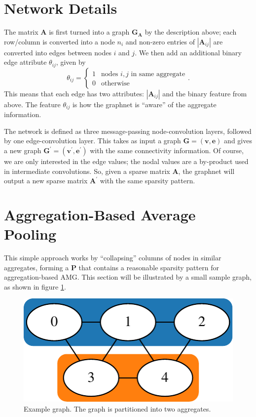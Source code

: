 \documentclass{article}
\newcommand{\abs}[1]{\left\lvert#1\right\rvert}
\newcommand{\mat}[1]{\bm{{#1}}}
\renewcommand{\vec}[1]{\bm{{#1}}}
\begin{document}
\section{Network Details}\label{sec:graphnet}
The matrix $\mat{A}$ is first turned into a graph $\mat{G}_{\mat{A}}$ by the description above; each row/column is converted into a node $n_i$ and non-zero entries of $\abs{\mat{A}_{ij}}$ are converted into edges between nodes $i$ and $j$.  We then add an additional binary edge attribute $\theta_{ij}$, given by
\begin{equation}
  \theta_{ij} = \begin{cases} 1 & \text{nodes } i,j \text{ in same aggregate} \\ 0 & \text{otherwise} \end{cases}.
\end{equation}
This means that each edge has two attributes: $\abs{\mat{A}_{ij}}$ and the binary feature from above.  The feature $\theta_{ij}$ is how the graphnet is ``aware'' of the aggregate information.

The network is defined as three message-passing node-convolution layers, followed by one edge-convolution layer.  This takes as input a graph $\mat{G} = \left(\vec{v}, \vec{e}\right)$ and gives a new graph $\mat{G}^\prime = \left(\vec{v}^\prime, \vec{e}^\prime\right)$ with the same connectivity information.  Of course, we are only interested in the edge values; the nodal values are a by-product used in intermediate convolutions.  So, given a sparse matrix $\mat{A}$, the graphnet will output a new sparse matrix $\mat{A}^\prime$ with the same sparsity pattern.

\section{Aggregation-Based Average Pooling}\label{sec:avg_pooling}
This simple approach works by ``collapsing'' columns of nodes in similar aggregates, forming a $\mat{P}$ that contains a reasonable sparsity pattern for aggregation-based AMG.  This section will be illustrated by a small sample graph, as shown in figure \ref{fig:example_graph}.

\begin{figure}[h]
  \centering
  \includegraphics{figures/agg_example.pdf}
  \caption{Example graph.  The graph is partitioned into two aggregates.}
  \label{fig:example_graph}
\end{figure}
\end{document}
